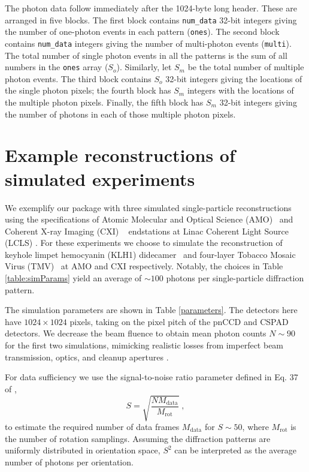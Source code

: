 \documentclass[]{iucr}              %
\begin{document}
The photon data follow immediately after the 1024-byte long header. These are arranged in five blocks. The first block contains \texttt{num\_data} 32-bit integers giving the number of one-photon events in each pattern (\texttt{ones}). The second block contains \texttt{num\_data} integers giving the number of multi-photon events (\texttt{multi}). The total number of single photon events in all the patterns is the sum of all numbers in the \texttt{ones} array ($S_o$). Similarly, let $S_m$ be the total number of multiple photon events. The third block contains $S_o$ 32-bit integers giving the locations of the single photon pixels; the fourth block has $S_m$ integers with the locations of the multiple photon pixels. Finally, the fifth block has $S_m$ 32-bit integers giving the number of photons in each of those multiple photon pixels. 


     
\section{Example reconstructions of simulated experiments}\label{sec:simulations}

We exemplify our package with three simulated single-particle reconstructions using the specifications of Atomic Molecular and Optical Science (AMO)~\cite{ferguson2015} and Coherent X-ray Imaging (CXI) ~\cite{liang2015} endstations at Linac Coherent Light Source (LCLS) \cite{Emma2010}. For these experiments we choose to simulate the reconstruction of keyhole limpet hemocyanin (KLH1) didecamer~\cite{gatsogiannis2009} and four-layer Tobacco Mosaic Virus (TMV)~\cite{bhyravbhatla1998} at AMO and CXI respectively. Notably, the choices in Table \ref{table:simParams} yield an average of $\sim 100$ photons per single-particle diffraction pattern.



The simulation parameters are shown in Table \ref{parameters}. The detectors here have $1024\times1024$ pixels, taking on the pixel pitch of the pnCCD\cite{Struder2010} and CSPAD\cite{hart2012} detectors. We decrease the beam fluence to obtain mean photon counts $N\sim 90$ for the first two simulations, mimicking realistic losses from imperfect beam transmission, optics, and cleanup apertures \cite{Loh2013}. 

For data sufficiency we use the signal-to-noise ratio parameter defined in Eq. 37 of , 
\begin{equation}
S = \sqrt{\frac{N M_{\text{data}}}{M_{\text{rot}}}}\; ,
\end{equation}
to estimate the required number of data frames $M_{\text{data}}$ for $S\sim50$, where $M_{\text{rot}}$ is the number of rotation samplings. Assuming the diffraction patterns are uniformly distributed in orientation space, $S^2$ can be interpreted as the average number of photons per orientation.
\end{document}
